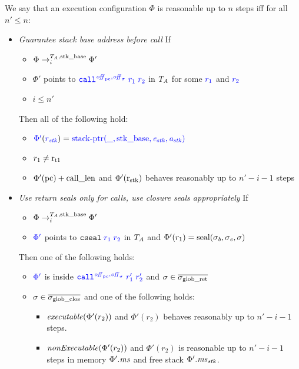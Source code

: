 \documentclass[a4paper]{article}
\begin{document}
\begin{definition}
  \label{def:reasonable-conf}
  We say that an execution configuration $\Phi$ is reasonable up to $n$ steps
  iff for all $n' \le n$:
  \begin{itemize}
  \item \emph{Guarantee stack base address before call} If
    \begin{itemize}
    \item $\Phi \nstep[i]{\ta,\stkb} \Phi'$
    \item $\Phi'$ points to $\src{\scall{\offpc,\offsigma}{r_1}{r_2}}$ in $\ta$
      for some $\src{r_1}$ and $\src{r_2}$
    \item $i \le n'$
    \end{itemize}
    Then all of the following hold:
    \begin{itemize}
    \item $\src{\Phi'}(\src{r_\stk}) =
      \src{\stkptr{\_,\stkb,\eaddr_\stk,\aaddr_\stk}}$
    \item $r_1 \neq \rtmp{1}$
    \item $\Phi'(\pcreg) + \calllen$ and $\Phi'(\rstk)$ behaves reasonably up to
      $n'-i - 1$ steps
    \end{itemize}
  \item \emph{Use return seals only for calls, use closure seals appropriately} If
    \begin{itemize}
    \item $\Phi \nstep[i]{\ta,\stkb} \Phi'$
    \item $\src{\Phi'}$ points to $\src{\tcseal{r_1}{r_2}}$ in $\ta$ and $\Phi'(r_1) = \seal{\sigma_\baddr,\sigma_\eaddr,\sigma}$
    \end{itemize}
    Then one of the following holds:
    \begin{itemize}
    \item $\src{\Phi'}$ is inside $\src{\scall{\offpc,\offsigma}{r_1'}{r_2'}}$
      and $\sigma \in \gsigrets$
    \item $\sigma \in \gsigcloss$ and one of the following holds:
      \begin{itemize}
      \item $\exec{\Phi'(r_2)}$ and $\Phi'(r_2)$ behaves reasonably up to $n' - i - 1$ steps.
      \item $\nonExec{\Phi'(r_2)}$ and $\Phi'(r_2)$ is reasonable up to $n' - i - 1$ steps in memory $\Phi'.\ms$ and free stack $\Phi'.\ms_\stk$.
      \end{itemize}
    \end{itemize}

\end{itemize}
\end{definition}
\end{document}
